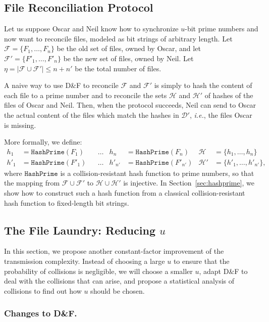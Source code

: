 \documentclass{llncs}
\newcommand{\Set}{\mathcal{H}}
\newcommand{\SetD}{\mathcal{D}}
\newcommand{\Files}{\mathcal{F}}
\newcommand{\df}{D\&F\xspace}
\newcommand{\ie}{\textit{i.e.}\xspace}
\newcommand{\HashPrime}{\ensuremath{\mathtt{HashPrime}}}
\begin{document}
\subsection{File Reconciliation Protocol}

Let us suppose Oscar and Neil know how to synchronize $u$-bit prime numbers and now want to reconcile files, modeled as bit strings of arbitrary length.
Let $\Files = \{F_1,\dots,F_n\}$ be the old set of files, owned by Oscar, and let $\Files' = \{F'_1,\dots,F'_n\}$ be the new set of files, owned by Neil.
Let $\eta = | \Files \cup \Files'| \le n+n'$ be the total number of files.

A naive way to use \df to reconcile $\Files$ and $\Files'$ is simply to hash the content of each file to a prime number and to reconcile the sets $\Set$ and $\Set'$ of hashes of the files of Oscar and Neil.
Then, when the protocol succeeds, Neil can send to Oscar the actual content of the files which match the hashes in $\SetD'$, \ie, the files Oscar is missing.

More formally, we define:
\begin{align*}
h_1 &= \HashPrime(F_1) & &\dots & h_n &= \HashPrime(F_n) & \Set &= \{h_1,\dots,h_n\} \\
h'_1 &= \HashPrime(F'_1) & &\dots & h'_{n'} &= \HashPrime(F'_{n'}) & \Set' &= \{h'_1,\dots,h'_{n'}\},
\end{align*}
where $\HashPrime$ is a collision-resistant hash function to prime numbers, so that the mapping from $\Files \cup \Files'$ to $\Set \cup \Set'$ is injective.
In Section~\ref{sec:hashprime}, we show how to construct such a hash function from a classical collision-resistant hash function to fixed-length bit strings.

\subsection{The File Laundry: Reducing $u$}
\label{sec:shortu}
In this section, we propose another constant-factor improvement of the transmission complexity. Instead of choosing a large $u$ to ensure that the probability of collisions is negligible, we will choose a smaller $u$, adapt \df to deal with the collisions that can arise, and propose a statistical analysis of collisions to find out how $u$ should be chosen.

\subsubsection{Changes to \df.}
\end{document}
